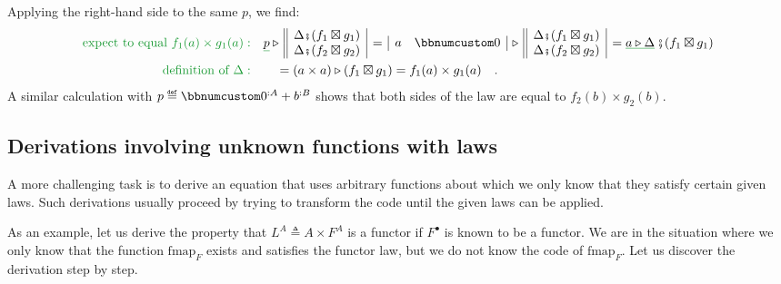 Applying the right-hand side to the same $p$, we find:
\begin{align*}
{\color{greenunder}\text{expect to equal }f_{1}(a)\times g_{1}(a):}\quad & \gunderline p\triangleright\,\begin{array}{||c|}
\Delta\bef(f_{1}\boxtimes g_{1})\\
\Delta\bef(f_{2}\boxtimes g_{2})
\end{array}\,=\,\begin{array}{|cc|}
a & \bbnum 0\end{array}\,\triangleright\,\begin{array}{||c|}
\Delta\bef(f_{1}\boxtimes g_{1})\\
\Delta\bef(f_{2}\boxtimes g_{2})
\end{array}\,=\gunderline{a\triangleright\Delta}\,\bef(f_{1}\boxtimes g_{1})\\
{\color{greenunder}\text{definition of }\Delta:}\quad & \quad=(a\times a)\triangleright(f_{1}\boxtimes g_{1})=f_{1}(a)\times g_{1}(a)\quad.
\end{align*}
A similar calculation with $p\triangleq\bbnum 0^{:A}+b^{:B}$ shows
that both sides of the law are equal to $f_{2}(b)\times g_{2}(b)$.

\subsection{Derivations involving unknown functions with laws}

A more challenging task is to derive an equation that uses arbitrary
functions about which we only know that they satisfy certain given
laws. Such derivations usually proceed by trying to transform the
code until the given laws can be applied.

As an example, let us derive the property that $L^{A}\triangleq A\times F^{A}$
is a functor if $F^{\bullet}$ is known to be a functor. We are in
the situation where we only know that the function $\text{fmap}_{F}$
exists and satisfies the functor law, but we do not know the code
of $\text{fmap}_{F}$. Let us discover the derivation step by step.

